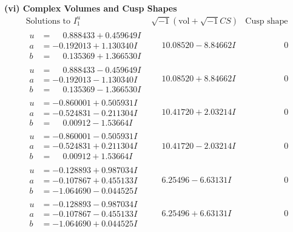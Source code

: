 \documentclass[1p]{elsarticle_modified}
\theoremstyle{definition}
\newcommand{\I}{\sqrt{-1}}
\begin{document}
\newpage\flushleft \textbf{(vi) Complex Volumes and Cusp Shapes}
$$\begin{array}{c|c|c}  
\text{Solutions to }I^u_{1}& \I (\text{vol} + \sqrt{-1}CS) & \text{Cusp shape}\\
 \hline 
\begin{aligned}
u &= \phantom{-}0.888433 + 0.459649 I \\
a &= -0.192013 + 1.130340 I \\
b &= \phantom{-}0.135369 + 1.366530 I\end{aligned}
 & \phantom{-}10.08520 - 8.84662 I & \phantom{-0.000000 } 0 \\ \hline\begin{aligned}
u &= \phantom{-}0.888433 - 0.459649 I \\
a &= -0.192013 - 1.130340 I \\
b &= \phantom{-}0.135369 - 1.366530 I\end{aligned}
 & \phantom{-}10.08520 + 8.84662 I & \phantom{-0.000000 } 0 \\ \hline\begin{aligned}
u &= -0.860001 + 0.505931 I \\
a &= -0.524831 - 0.211304 I \\
b &= \phantom{-}0.00912 - 1.53664 I\end{aligned}
 & \phantom{-}10.41720 + 2.03214 I & \phantom{-0.000000 } 0 \\ \hline\begin{aligned}
u &= -0.860001 - 0.505931 I \\
a &= -0.524831 + 0.211304 I \\
b &= \phantom{-}0.00912 + 1.53664 I\end{aligned}
 & \phantom{-}10.41720 - 2.03214 I & \phantom{-0.000000 } 0 \\ \hline\begin{aligned}
u &= -0.128893 + 0.987034 I \\
a &= -0.107867 + 0.455133 I \\
b &= -1.064690 - 0.044525 I\end{aligned}
 & \phantom{-}6.25496 - 6.63131 I & \phantom{-0.000000 } 0 \\ \hline\begin{aligned}
u &= -0.128893 - 0.987034 I \\
a &= -0.107867 - 0.455133 I \\
b &= -1.064690 + 0.044525 I\end{aligned}
 & \phantom{-}6.25496 + 6.63131 I & \phantom{-0.000000 } 0 \\ \hline\begin{aligned}

\end{aligned}
\end{array}$$
\end{document}

